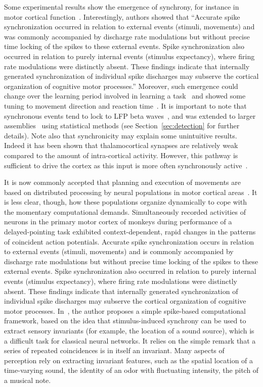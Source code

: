 \documentclass[brainsci, %
               review,submit,pdftex,moreauthors%
               ]{Definitions/mdpi}
\begin{document}
%
Some experimental results show the emergence of synchrony, for instance in motor cortical function~\citep{riehle_spike_1997}. Interestingly, authors showed that ``Accurate spike synchronization occurred in relation to external events (stimuli, movements) and was commonly accompanied by discharge rate modulations but without precise time locking of the spikes to these external events. Spike synchronization also occurred in relation to purely internal events (stimulus expectancy), where firing rate modulations were distinctly absent. These findings indicate that internally generated synchronization of individual spike discharges may subserve the cortical organization of cognitive motor processes.'' Moreover, such emergence could change over the learning period involved in learning a task~\citep{kilavik_long-term_2009} and showed some tuning to movement direction and reaction time~\citep{grammont_spike_2003}. It is important to note that synchronous events tend to lock to LFP beta waves~\citep{denker_lfp_2018}, and was extended to larger assemblies~\citep{torre_synchronous_2016} using statistical methods (see Section~\ref{sec:detection} for further details). Note also that synchronicity may explain some unintuitive results. Indeed it has been shown that thalamocortical synapses are relatively weak compared to the amount of intra-cortical activity. However, this pathway is sufficient to drive the cortex as this input is more often synchronously active~\citep{bruno_cortex_2006}. 

It is now commonly accepted that planning and execution of movements are based on distributed processing by neural populations in motor cortical areas~\citep{riehle_spike_1997,grammont_precise_1999}. It is less clear, though, how these populations organize dynamically to cope with the momentary computational demands. Simultaneously recorded activities of neurons in the primary motor cortex of monkeys during performance of a delayed-pointing task exhibited context-dependent, rapid changes in the patterns of coincident action potentials. Accurate spike synchronization occurs in relation to external events (stimuli, movements) and is commonly accompanied by discharge rate modulations but without precise time locking of the spikes to these external events. Spike synchronization also occurred in relation to purely internal events (stimulus expectancy), where firing rate modulations were distinctly absent. These findings indicate that internally generated synchronization of individual spike discharges may subserve the cortical organization of cognitive motor processes. In~\citep{brette_computing_2012}, the author proposes a simple spike-based computational framework, based on the idea that stimulus-induced synchrony can be used to extract sensory invariants (for example, the location of a sound source), which is a difficult task for classical neural networks. It relies on the simple remark that a series of repeated coincidences is in itself an invariant. Many aspects of perception rely on extracting invariant features, such as the spatial location of a time-varying sound, the identity of an odor with fluctuating intensity, the pitch of a musical note.
\end{document}
